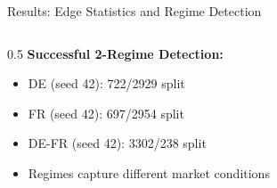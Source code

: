 \documentclass[aspectratio=169]{beamer}
\begin{document}
\begin{frame}{Results: Edge Statistics and Regime Detection}
\begin{columns}
\begin{column}{0.5\textwidth}
\vspace{0.3cm}
\textbf{Successful 2-Regime Detection:}
\begin{itemize}
    \item DE (seed 42): 722/2929 split
    \item FR (seed 42): 697/2954 split
    \item DE-FR (seed 42): 3302/238 split
    \item Regimes capture different market conditions
\end{itemize}
\end{column}
\end{columns}

\begin{center}
\end{center}
\end{frame}
\end{document}
